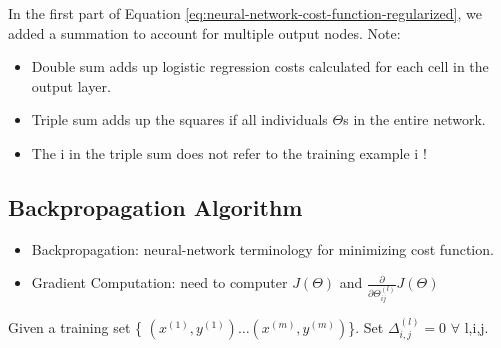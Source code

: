     In the first part of Equation \ref{eq:neural-network-cost-function-regularized}, we added a summation to account for multiple output nodes. 
    Note:
    \begin{itemize}
        \item Double sum adds up logistic regression costs calculated for each cell in the output layer.
        \item Triple sum adds up the squares if all individuals $\Theta$s in the entire network.
        \item The i in the triple sum does not refer to the training example i !
    \end{itemize}

\subsection{Backpropagation Algorithm}
    \begin{itemize}
        \item Backpropagation: neural-network terminology for minimizing cost function.
        \item Gradient Computation: need to computer $J(\Theta)$ and $\frac{\partial }{\partial \Theta^{(l)}_{ij}} J(\Theta)$

    \end{itemize}

    Given a training set \{ $(x^{(1)}, y^{(1)}) \dots (x^{(m)}, y^{(m)})$\}. Set $\Delta^{(l)}_{i,j}=0$ $\forall$ l,i,j.\\
          

